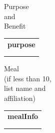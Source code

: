\documentclass{article}
\begin{document}
\vspace{1cm}
\noindent
\begin{minipage}{0.15\textwidth}
\centering
    \vspace{-0.3cm} %
    \small
    Purpose\\ %
    and\\         %
    Benefit
\end{minipage}%
\begin{minipage}{0.7\textwidth}
    \begin{tabular}{|p{\textwidth}|}
        \hline
        \normalsize \textbf{ {{purpose}} }\\ %
        \\
        \\
        \hline
    \end{tabular}
\end{minipage}

\vspace{1cm}
\noindent
\begin{minipage}{0.15\textwidth}
    \vspace{-0.3cm} %
    \small
    Meal\\ %
    (if less than 10,\\         %
    list name and\\
    affiliation)
\end{minipage}%
\begin{minipage}{0.7\textwidth}
    \begin{tabular}{|p{\textwidth}|}
        \hline
        \normalsize \textbf{ {{mealInfo}} }\\ %
        \\
        \\
        \hline
    \end{tabular}
\end{minipage}

\vspace{1cm}
\end{document}
